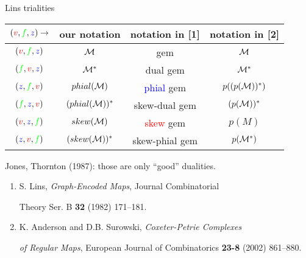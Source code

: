 \documentclass[%
pdf,
colorBG,
slideColor,
]{prosper}
\begin{document}
\begin{slide}{Lins trialities}
\begin{tabular}{||c|c|c|c||}
\hline
$(\textcolor{red}{v},\textcolor{green}{f},\textcolor{blue}{z})\rightarrow $   &our notation          &notation in [1]  &notation in [2]\\
\hline
$(\textcolor{red}{v},\textcolor{green}{f},\textcolor{blue}{z})$               &${\cal M}$            &gem                   &${\cal M}$\\  %
$(\textcolor{green}{f},\textcolor{red}{v},\textcolor{blue}{z})$               &${\cal M}^*$          &dual gem              &${\cal M}^*$\\  %
$(\textcolor{blue}{z},\textcolor{green}{f},\textcolor{red}{v})$               &$phial({\cal M})$     &\textcolor{blue}{phial} gem             &$p((p({\cal M}))^*)$\\  %
$(\textcolor{green}{f},\textcolor{blue}{z},\textcolor{red}{v})$               &$(phial({\cal M}))^*$ &skew-dual gem         &$(p({\cal M}))^*$\\  %
$(\textcolor{red}{v},\textcolor{blue}{z},\textcolor{green}{f})$               &$skew({\cal M})$      &\textcolor{red}{skew} gem              &$p(M)$\\  %
$(\textcolor{blue}{z},\textcolor{red}{v},\textcolor{green}{f})$               &$(skew({\cal M}))^*$  &skew-phial gem        &$p({\cal M}^*)$\\\hline  %
\end{tabular}
Jones, Thornton (1987): those are only ``good'' dualities.

{\scriptsize
\begin{enumerate}
\item S. Lins, {\em Graph-Encoded Maps}, Journal Combinatorial

Theory Ser. B {\bf 32} (1982) 171--181.

\item K. Anderson and D.B. Surowski, {\em Coxeter-Petrie Complexes}

{\em of Regular Maps}, European Journal of Combinatorics {\bf 23-8} (2002) 861--880.
\end{enumerate}
}


\end{slide}
\end{document}
